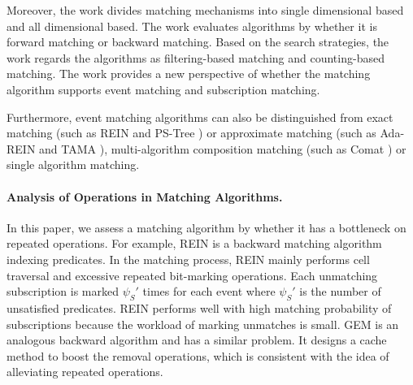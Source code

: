 \documentclass[runningheads]{llncs}
\begin{document}
Moreover, the work \cite{GEM} divides matching mechanisms into single dimensional based and all dimensional based. The work \cite{REIN} evaluates algorithms by whether it is forward matching or backward matching. Based on the search strategies, the work \cite{2020SCSL} regards the algorithms as filtering-based matching and counting-based matching. The work \cite{MO-tree} provides a new perspective of whether the matching algorithm supports event matching and subscription matching.

Furthermore, event matching algorithms can also be distinguished from exact matching (such as REIN \cite{REIN} and PS-Tree \cite{PS-Tree}) or approximate matching (such as Ada-REIN \cite{Ada-REIN} and TAMA \cite{TAMA}), multi-algorithm composition matching (such as Comat \cite{comat}) or single algorithm matching. 

\paragraph{Analysis of Operations in Matching Algorithms. }
In this paper, we assess a matching algorithm by whether it has a bottleneck on repeated operations.
For example, REIN \cite{REIN} is a backward matching algorithm indexing predicates. In the matching process, REIN mainly performs cell traversal and excessive repeated bit-marking operations. Each unmatching subscription is marked $\psi_S'$ times for each event where $\psi_S'$ is the number of unsatisfied predicates. REIN performs well with high matching probability of subscriptions because the workload of marking unmatches is small.
GEM \cite{GEM} is an analogous backward algorithm and has a similar problem. It designs a cache method to boost the removal operations, which is consistent with the idea of alleviating repeated operations.
\end{document}
